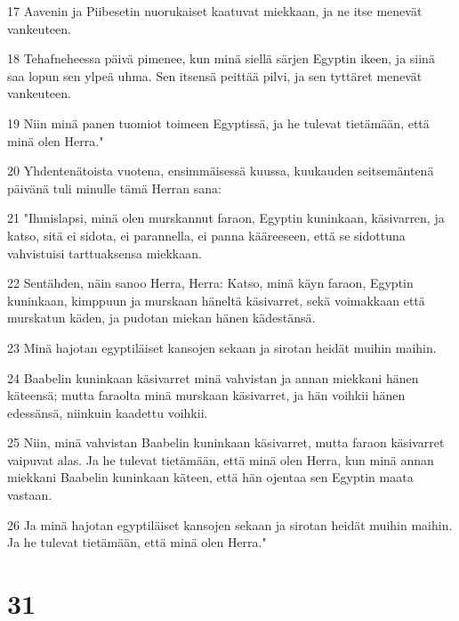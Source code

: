 \par 17 Aavenin ja Piibesetin nuorukaiset kaatuvat miekkaan, ja ne itse menevät vankeuteen.
\par 18 Tehafneheessa päivä pimenee, kun minä siellä särjen Egyptin ikeen, ja siinä saa lopun sen ylpeä uhma. Sen itsensä peittää pilvi, ja sen tyttäret menevät vankeuteen.
\par 19 Niin minä panen tuomiot toimeen Egyptissä, ja he tulevat tietämään, että minä olen Herra."
\par 20 Yhdentenätoista vuotena, ensimmäisessä kuussa, kuukauden seitsemäntenä päivänä tuli minulle tämä Herran sana:
\par 21 "Ihmislapsi, minä olen murskannut faraon, Egyptin kuninkaan, käsivarren, ja katso, sitä ei sidota, ei parannella, ei panna kääreeseen, että se sidottuna vahvistuisi tarttuaksensa miekkaan.
\par 22 Sentähden, näin sanoo Herra, Herra: Katso, minä käyn faraon, Egyptin kuninkaan, kimppuun ja murskaan häneltä käsivarret, sekä voimakkaan että murskatun käden, ja pudotan miekan hänen kädestänsä.
\par 23 Minä hajotan egyptiläiset kansojen sekaan ja sirotan heidät muihin maihin.
\par 24 Baabelin kuninkaan käsivarret minä vahvistan ja annan miekkani hänen käteensä; mutta faraolta minä murskaan käsivarret, ja hän voihkii hänen edessänsä, niinkuin kaadettu voihkii.
\par 25 Niin, minä vahvistan Baabelin kuninkaan käsivarret, mutta faraon käsivarret vaipuvat alas. Ja he tulevat tietämään, että minä olen Herra, kun minä annan miekkani Baabelin kuninkaan käteen, että hän ojentaa sen Egyptin maata vastaan.
\par 26 Ja minä hajotan egyptiläiset kansojen sekaan ja sirotan heidät muihin maihin. Ja he tulevat tietämään, että minä olen Herra."

\chapter{31}

